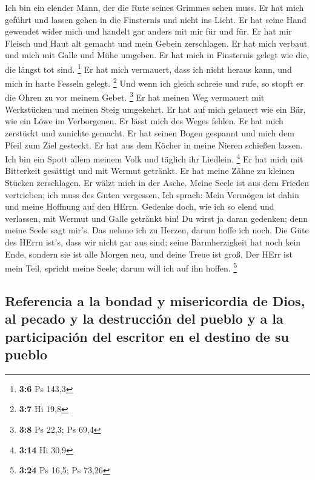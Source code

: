  Ich bin ein elender Mann, der die Rute seines Grimmes
sehen muss.  Er hat mich geführt und lassen gehen in die
Finsternis und nicht ins Licht.  Er hat seine Hand
gewendet wider mich und handelt gar anders mit mir für und für.
 Er hat mir Fleisch und Haut alt gemacht und mein Gebein
zerschlagen.  Er hat mich verbaut und mich mit Galle und
Mühe umgeben.  Er hat mich in Finsternis gelegt wie die,
die längst tot sind. \footnote{\textbf{3:6} Ps 143,3}  Er
hat mich vermauert, dass ich nicht heraus kann, und mich in harte
Fesseln gelegt. \footnote{\textbf{3:7} Hi 19,8}  Und wenn
ich gleich schreie und rufe, so stopft er die Ohren zu vor meinem Gebet.
\footnote{\textbf{3:8} Ps 22,3; Ps 69,4}  Er hat meinen
Weg vermauert mit Werkstücken und meinen Steig umgekehrt.
 Er hat auf mich gelauert wie ein Bär, wie ein Löwe im
Verborgenen.  Er lässt mich des Weges fehlen. Er hat mich
zerstückt und zunichte gemacht.  Er hat seinen Bogen
gespannt und mich dem Pfeil zum Ziel gesteckt.  Er hat
aus dem Köcher in meine Nieren schießen lassen.  Ich bin
ein Spott allem meinem Volk und täglich ihr Liedlein. \footnote{\textbf{3:14}
  Hi 30,9}  Er hat mich mit Bitterkeit gesättigt und mit
Wermut getränkt.  Er hat meine Zähne zu kleinen Stücken
zerschlagen. Er wälzt mich in der Asche.  Meine Seele ist
aus dem Frieden vertrieben; ich muss des Guten vergessen.
 Ich sprach: Mein Vermögen ist dahin und meine Hoffnung
auf den HErrn.  Gedenke doch, wie ich so elend und
verlassen, mit Wermut und Galle getränkt bin!  Du wirst
ja daran gedenken; denn meine Seele sagt mir's.  Das
nehme ich zu Herzen, darum hoffe ich noch.  Die Güte des
HErrn ist's, dass wir nicht gar aus sind; seine Barmherzigkeit hat noch
kein Ende,  sondern sie ist alle Morgen neu, und deine
Treue ist groß.  Der HErr ist mein Teil, spricht meine
Seele; darum will ich auf ihn hoffen. \footnote{\textbf{3:24} Ps 16,5;
  Ps 73,26}

\hypertarget{referencia-a-la-bondad-y-misericordia-de-dios-al-pecado-y-la-destrucciuxf3n-del-pueblo-y-a-la-participaciuxf3n-del-escritor-en-el-destino-de-su-pueblo}{%
\subsection{Referencia a la bondad y misericordia de Dios, al pecado y
la destrucción del pueblo y a la participación del escritor en el
destino de su
pueblo}\label{referencia-a-la-bondad-y-misericordia-de-dios-al-pecado-y-la-destrucciuxf3n-del-pueblo-y-a-la-participaciuxf3n-del-escritor-en-el-destino-de-su-pueblo}}


